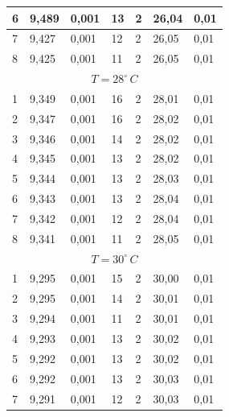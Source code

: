 \documentclass[10pt,a4paper]{article}
\begin{document}
\begin{longtable}[h!]{|l|l|l|l|l|l|l|}
6 & 9,489  & 0,001 & 13 & 2                      & 26,04 & 0,01                      \\ \hline
7 & 9,427  & 0,001 & 12 & 2                      & 26,05 & 0,01                      \\ \hline
8 & 9,425  & 0,001 & 11 & 2                      & 26,05 & 0,01                      \\ \hline
\multicolumn{7}{|c|}{$T = 28^{\circ}\,C$}                                            \\ \hline
1 & 9,349  & 0,001 & 16 & 2                      & 28,01 & 0,01                      \\ \hline
2 & 9,347  & 0,001 & 16 & 2                      & 28,02 & 0,01                      \\ \hline
3 & 9,346  & 0,001 & 14 & 2                      & 28,02 & 0,01                      \\ \hline
4 & 9,345  & 0,001 & 13 & 2                      & 28,02 & 0,01                      \\ \hline
5 & 9,344  & 0,001 & 13 & 2                      & 28,03 & 0,01                      \\ \hline
6 & 9,343  & 0,001 & 13 & 2                      & 28,04 & 0,01                      \\ \hline
7 & 9,342  & 0,001 & 12 & 2                      & 28,04 & 0,01                      \\ \hline
8 & 9,341  & 0,001 & 11 & 2                      & 28,05 & 0,01                      \\ \hline
\multicolumn{7}{|c|}{$T = 30^{\circ}\,C$}                                            \\ \hline
1 & 9,295  & 0,001 & 15 & 2                      & 30,00 & 0,01                      \\ \hline
2 & 9,295  & 0,001 & 14 & 2                      & 30,01 & 0,01                      \\ \hline
3 & 9,294  & 0,001 & 11 & 2                      & 30,01 & 0,01                      \\ \hline
4 & 9,293  & 0,001 & 13 & 2                      & 30,02 & 0,01                      \\ \hline
5 & 9,292  & 0,001 & 13 & 2                      & 30,02 & 0,01                      \\ \hline
6 & 9,292  & 0,001 & 13 & 2                      & 30,03 & 0,01                      \\ \hline
7 & 9,291  & 0,001 & 12 & 2                      & 30,03 & 0,01                      \\ \hline

\end{longtable}
\end{document}
